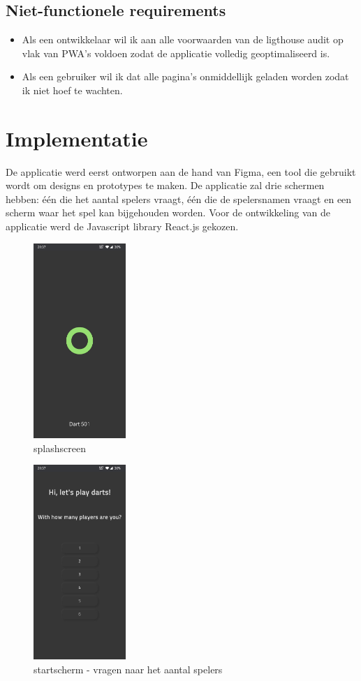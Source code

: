 	\subsection{Niet-functionele requirements}
		\begin{itemize}
			 \item Als een ontwikkelaar wil ik aan alle voorwaarden van de ligthouse audit op vlak van PWA's voldoen zodat de applicatie volledig geoptimaliseerd is.
			 \item Als een gebruiker wil ik dat alle pagina's onmiddellijk geladen worden zodat ik niet hoef te wachten.
		\end{itemize}	


\section{Implementatie}

	De applicatie werd eerst ontworpen aan de hand van Figma, een tool die gebruikt wordt om designs en prototypes te maken. De applicatie zal drie schermen hebben: één die het aantal spelers vraagt, één die de spelersnamen vraagt en een scherm waar het spel kan bijgehouden worden. Voor de ontwikkeling van de applicatie werd de Javascript library React.js gekozen.

	\begin{figure}[H]
		\centering
		\includegraphics[width=35mm]{./img/dart1.jpg}{}
		\caption{splashscreen}
	\end{figure}
	
	\begin{figure}[H]
		\centering
		\includegraphics[width=35mm]{./img/dart2.jpg}{}
		\caption{startscherm - vragen naar het aantal spelers}
	\end{figure}
	
